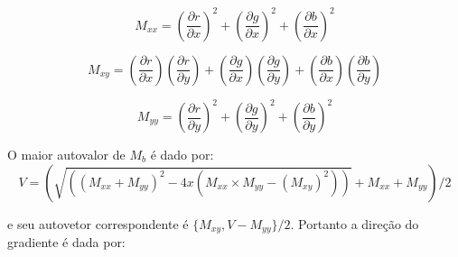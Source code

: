 




\begin{equation}
M_{xx} = (\frac{\partial r}{\partial x})^2+(\frac{\partial g}{\partial x})^2+(\frac{\partial b}{\partial x})^2
\end{equation}

\begin{equation}
M_{xy} =(\frac{\partial r}{\partial x})(\frac{\partial r}{\partial y})+(\frac{\partial g}{\partial x})(\frac{\partial g}{\partial y})+(\frac{\partial b}{\partial x})(\frac{\partial b}{\partial y})
\end{equation}

\begin{equation}
M_{yy} = (\frac{\partial r}{\partial y})^2+(\frac{\partial g}{\partial y})^2+(\frac{\partial b}{\partial y})^2
\end{equation}





O maior autovalor de $M_b$ é dado por:
\begin{equation}
V = (\sqrt{( (M_{xx}+M_{yy})^2 - 4 x(M_{xx} \times M_{yy} - (M_{xy})^2 ) )}+M_{xx}+ M_{yy})/2
\end{equation}

e seu autovetor correspondente é $ \{M_{xy},V-M_{yy}\}/2 $. Portanto a direção do gradiente é dada por:

